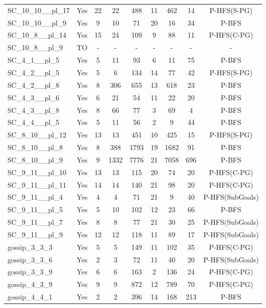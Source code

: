 \documentclass{article}
\begin{document}
\begin{tabular}{lcccccccc}
SC\_10\_10\_\_pl\_17 & Yes & 22 & 22 & 488 & 11 & 462 & 14 & P-HFS(S-PG) \\
SC\_10\_10\_\_pl\_9 & Yes & 9 & 10 & 71 & 20 & 16 & 34 & P-BFS \\
SC\_10\_8\_\_pl\_14 & Yes & 15 & 24 & 109 & 9 & 88 & 11 & P-HFS(C-PG) \\
SC\_10\_8\_\_pl\_9 & TO & - & - & - & - & - & - & - \\
SC\_4\_1\_\_pl\_5 & Yes & 5 & 11 & 93 & 6 & 11 & 75 & P-BFS \\
SC\_4\_2\_\_pl\_5 & Yes & 5 & 6 & 134 & 14 & 77 & 42 & P-HFS(S-PG) \\
SC\_4\_2\_\_pl\_8 & Yes & 8 & 306 & 655 & 13 & 618 & 23 & P-BFS \\
SC\_4\_3\_\_pl\_6 & Yes & 6 & 21 & 54 & 11 & 22 & 20 & P-BFS \\
SC\_4\_3\_\_pl\_8 & Yes & 8 & 66 & 77 & 3 & 69 & 4 & P-BFS \\
SC\_4\_4\_\_pl\_5 & Yes & 5 & 11 & 56 & 2 & 9 & 44 & P-BFS \\
SC\_8\_10\_\_pl\_12 & Yes & 13 & 13 & 451 & 10 & 425 & 15 & P-HFS(S-PG) \\
SC\_8\_10\_\_pl\_8 & Yes & 8 & 388 & 1793 & 19 & 1682 & 91 & P-BFS \\
SC\_8\_10\_\_pl\_9 & Yes & 9 & 1332 & 7776 & 21 & 7058 & 696 & P-BFS \\
SC\_9\_11\_\_pl\_10 & Yes & 13 & 13 & 115 & 20 & 74 & 20 & P-HFS(C-PG) \\
SC\_9\_11\_\_pl\_11 & Yes & 14 & 14 & 140 & 21 & 98 & 20 & P-HFS(C-PG) \\
SC\_9\_11\_\_pl\_4 & Yes & 4 & 4 & 71 & 21 & 9 & 40 & P-HFS(SubGoals) \\
SC\_9\_11\_\_pl\_5 & Yes & 5 & 10 & 102 & 12 & 23 & 66 & P-BFS \\
SC\_9\_11\_\_pl\_7 & Yes & 8 & 8 & 77 & 21 & 30 & 25 & P-HFS(SubGoals) \\
SC\_9\_11\_\_pl\_9 & Yes & 12 & 12 & 118 & 11 & 89 & 17 & P-HFS(SubGoals) \\
gossip\_3\_3\_3 & Yes & 5 & 5 & 149 & 11 & 102 & 35 & P-HFS(C-PG) \\
gossip\_3\_3\_6 & Yes & 2 & 3 & 72 & 11 & 40 & 20 & P-HFS(SubGoals) \\
gossip\_3\_3\_9 & Yes & 6 & 6 & 163 & 2 & 136 & 24 & P-HFS(C-PG) \\
gossip\_4\_3\_9 & Yes & 9 & 9 & 872 & 12 & 789 & 70 & P-HFS(C-PG) \\
gossip\_4\_4\_1 & Yes & 2 & 2 & 396 & 14 & 168 & 213 & P-BFS \\

\end{tabular}
\end{document}
